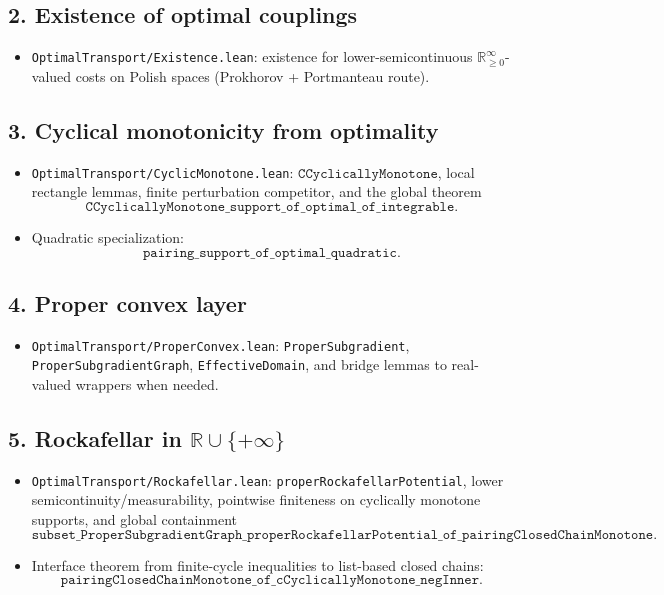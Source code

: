 \documentclass[11pt]{article}
\begin{document}
\subsection*{2. Existence of optimal couplings}
\begin{itemize}
\item \texttt{OptimalTransport/Existence.lean}: existence for lower-semicontinuous
  \(\mathbb R_{\ge0}^{\infty}\)-valued costs on Polish spaces (Prokhorov + Portmanteau route).
\end{itemize}

\subsection*{3. Cyclical monotonicity from optimality}
\begin{itemize}
\item \texttt{OptimalTransport/CyclicMonotone.lean}:
  \(\texttt{CCyclicallyMonotone}\), local rectangle lemmas, finite perturbation competitor,
  and the global theorem
  \[
    \texttt{CCyclicallyMonotone\_support\_of\_optimal\_of\_integrable}.
  \]
\item Quadratic specialization:
  \[
    \texttt{pairing\_support\_of\_optimal\_quadratic}.
  \]
\end{itemize}

\subsection*{4. Proper convex layer}
\begin{itemize}
\item \texttt{OptimalTransport/ProperConvex.lean}:
  \texttt{ProperSubgradient}, \texttt{ProperSubgradientGraph}, \texttt{EffectiveDomain},
  and bridge lemmas to real-valued wrappers when needed.
\end{itemize}

\subsection*{5. Rockafellar in \(\mathbb R\cup\{+\infty\}\)}
\begin{itemize}
\item \texttt{OptimalTransport/Rockafellar.lean}:
  \texttt{properRockafellarPotential}, lower semicontinuity/measurability,
  pointwise finiteness on cyclically monotone supports, and global containment
  \[
    \texttt{subset\_ProperSubgradientGraph\_properRockafellarPotential\_of\_pairingClosedChainMonotone}.
  \]
\item Interface theorem from finite-cycle inequalities to list-based closed chains:
  \[
    \texttt{pairingClosedChainMonotone\_of\_cCyclicallyMonotone\_negInner}.
  \]
\end{itemize}
\end{document}
